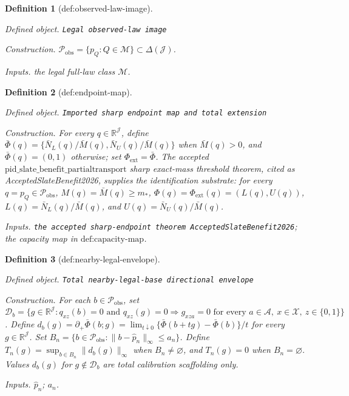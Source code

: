 \documentclass{article}
\newtheorem{definition}{Definition}
\begin{document}
\begin{definition}[def:observed-law-image]\label{def:observed-law-image}
\par\smallskip\noindent\emph{Defined object.} \texttt{Legal observed-\allowbreak{}law image}
\par\smallskip\noindent\emph{Construction.} \(\mathcal P_{\mathrm{obs}}=\{p_Q:Q\in\mathcal M\}\subset\Delta(\mathcal J)\).
\par\smallskip\noindent\emph{Inputs.} the legal full-law class \(\mathcal M\).
\end{definition}

\begin{definition}[def:endpoint-map]\label{def:endpoint-map}
\par\smallskip\noindent\emph{Defined object.} \texttt{Imported sharp endpoint map and total extension}
\par\smallskip\noindent\emph{Construction.} For every \(q\in\mathbb R^{\mathcal J}\), define \(\bar\Phi(q)=\{\bar N_L(q)/\bar M(q),\bar N_U(q)/\bar M(q)\}\) when \(\bar M(q)>0\), and \(\bar\Phi(q)=(0,1)\) otherwise; set \(\Phi_{\mathrm{ext}}=\bar\Phi\). The accepted \(\text{pid\_slate\_benefit\_partialtransport}\) sharp exact-mass threshold theorem, cited as AcceptedSlateBenefit2026, supplies the identification substrate: for every \(q=p_Q\in\mathcal P_{\mathrm{obs}}\), \(M(q)=\bar M(q)\ge m_*\), \(\Phi(q)=\Phi_{\mathrm{ext}}(q)=(L(q),U(q))\), \(L(q)=\bar N_L(q)/\bar M(q)\), and \(U(q)=\bar N_U(q)/\bar M(q)\).
\par\smallskip\noindent\emph{Inputs.} \texttt{the accepted sharp-\allowbreak{}endpoint theorem AcceptedSlateBenefit2026}; the capacity map in \(\text{def:capacity-map}\).
\end{definition}

\begin{definition}[def:nearby-legal-envelope]\label{def:nearby-legal-envelope}
\par\smallskip\noindent\emph{Defined object.} \texttt{Total nearby-\allowbreak{}legal-\allowbreak{}base directional envelope}
\par\smallskip\noindent\emph{Construction.} For each \(b\in\mathcal P_{\mathrm{obs}}\), set \(\mathcal D_b=\{g\in\mathbb R^{\mathcal J}:q_{xz}(b)=0\text{ and }q_{xz}(g)=0\Longrightarrow g_{xza}=0\text{ for every }a\in\mathcal A,\ x\in\mathcal X,\ z\in\{0,1\}\}\). Define \(d_b(g)=\partial_+\bar\Phi(b;g)=\lim_{t\downarrow0}\{\bar\Phi(b+tg)-\bar\Phi(b)\}/t\) for every \(g\in\mathbb R^{\mathcal J}\). Set \(B_n=\{b\in\mathcal P_{\mathrm{obs}}:\|b-\widehat p_n\|_\infty\le a_n\}\). Define \(T_n(g)=\sup_{b\in B_n}\|d_b(g)\|_\infty\) when \(B_n\ne\varnothing\), and \(T_n(g)=0\) when \(B_n=\varnothing\). Values \(d_b(g)\) for \(g\notin\mathcal D_b\) are total calibration scaffolding only.
\par\smallskip\noindent\emph{Inputs.} \(\widehat p_n\); \(a_n\).
\end{definition}
\end{document}
